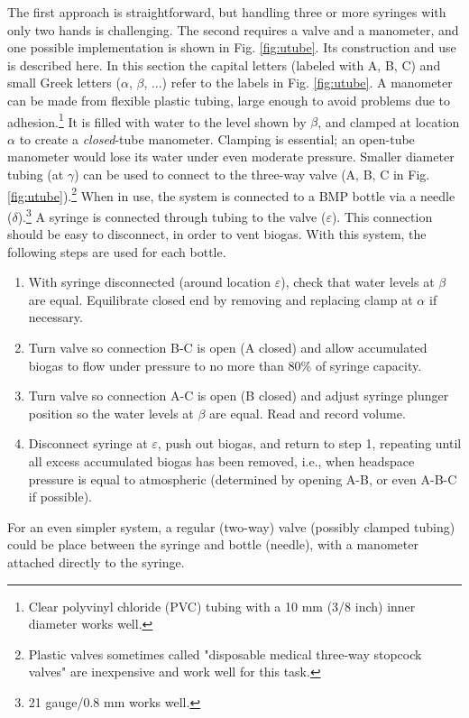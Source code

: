 \documentclass[]{article}
\begin{document}
The first approach is straightforward, but handling three or more syringes with only two hands is challenging.
The second requires a valve and a manometer, and one possible implementation is shown in Fig. \ref{fig:utube}.
Its construction and use is described here.
In this section the capital letters (labeled with A, B, C) and small Greek letters ($\alpha$, $\beta$, ...) refer to the labels in Fig. \ref{fig:utube}.
A manometer can be made from flexible plastic tubing, large enough to avoid problems due to adhesion.\footnote{Clear polyvinyl chloride (PVC) tubing with a 10 mm (3/8 inch) inner diameter works well.}
It is filled with water to the level shown by $\beta$, and clamped at location $\alpha$ to create a \textit{closed}-tube manometer.
Clamping is essential; an open-tube manometer would lose its water under even moderate pressure.
Smaller diameter tubing (at $\gamma$) can be used to connect to the three-way valve (A, B, C in Fig. \ref{fig:utube}).\footnote{Plastic valves sometimes called "disposable medical three-way stopcock valves" are inexpensive and work well for this task.}
When in use, the system is connected to a BMP bottle via a needle ($\delta$).\footnote{21 gauge/0.8 mm works well.}
A syringe is connected through tubing to the valve ($\varepsilon$).
This connection should be easy to disconnect, in order to vent biogas.
With this system, the following steps are used for each bottle.

\begin{enumerate}
  \item With syringe disconnected (around location $\varepsilon$), check that water levels at $\beta$ are equal. Equilibrate closed end by removing and replacing clamp at $\alpha$ if necessary.
  \item Turn valve so connection B-C is open (A closed) and allow accumulated biogas to flow under pressure to no more than 80\% of syringe capacity.
  \item Turn valve so connection A-C is open (B closed) and adjust syringe plunger position so the water levels at $\beta$ are equal. Read and record volume.
  \item Disconnect syringe at $\varepsilon$, push out biogas, and return to step 1, repeating until all excess accumulated biogas has been removed, i.e., when headspace pressure is equal to atmospheric (determined by opening A-B, or even A-B-C if possible).
\end{enumerate}

For an even simpler system, a regular (two-way) valve (possibly clamped tubing) could be place between the syringe and bottle (needle), with a manometer attached directly to the syringe.
\end{document}
